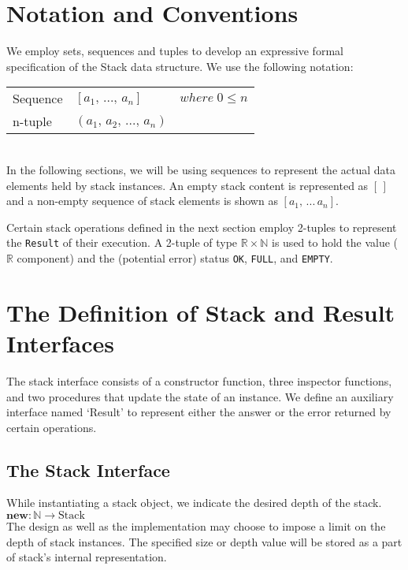 \documentclass[10pt]{article}
\begin{document}
\section{Notation and Conventions}
We employ sets, sequences and tuples to develop an expressive formal specification of the Stack data structure. We use the following notation:\vspace*{6pt}\\
\noindent\hspace*{32pt}\begin{tabular}{lll}
  Sequence & $[a_1, \, ..., \, a_n]$ & $where \; 0 \leq n$\vspace*{2pt}\\
  n-tuple & $(a_1, \, a_2, \, ...,\, a_n)$\\
\end{tabular}\vspace*{4pt}\\

In the following sections, we will be using sequences to represent the actual data elements held by stack instances. An empty stack content is represented as $[\,]$ and a non-empty sequence of stack elements is shown as $[a_1, \,...\, a_n].$

 Certain stack operations defined in the next section employ 2-tuples to represent the \texttt{Result} of their execution. A 2-tuple of type $\mathbb{R} \times \mathbb{N}$ is used to hold the value ($\mathbb{R}$ component) and the (potential error) status \texttt{OK}, \texttt{FULL}, and \texttt{EMPTY}. 

\section{The Definition of Stack and Result Interfaces}
  \noindent The stack interface consists of a constructor function, three inspector functions, and two procedures that update the state of an instance. We define an auxiliary interface named `Result' to represent either the answer or the error returned by certain operations.   
  
  \subsection{The Stack Interface}
  \noindent While instantiating a stack object, we indicate the desired depth of the stack. 
  \vspace*{6pt}\\\hspace*{32pt}\(
  \textbf{new}: \mathbb{N} \rightarrow \mathrm{Stack}
  \)\vspace*{6pt}\\
  The design as well as the implementation may choose to impose a limit on the depth of stack instances. The specified size or depth value will be stored as a part of stack's internal representation.  
\end{document}
